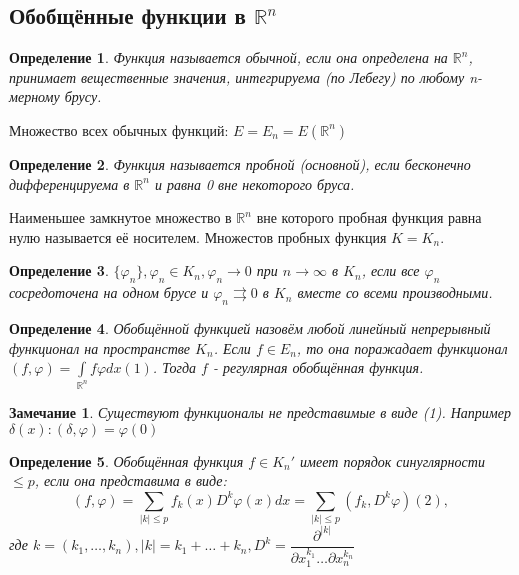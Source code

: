 \documentclass[9pt, a4paper]{article}
\newtheorem*{notabene}{Замечание}
\newtheorem*{definition}{Определение}
\begin{document}
	\subsection*{Обобщённые функции в $\mathbb{R}^n$}
		\begin{definition}
			Функция называется обычной, если она определена на $\mathbb{R}^n$, принимает вещественные значения, интегрируема (по Лебегу) по любому n-мерному брусу.
		\end{definition}
		Множество всех обычных функций: $E = E_n = E(\mathbb{R}^n)$
		\begin{definition}
			Функция называется пробной (основной), если бесконечно дифференцируема в $\mathbb{R}^n$ и равна 0 вне некоторого бруса.
		\end{definition}
		Наименьшее замкнутое множество в $\mathbb{R}^n$ вне которого пробная функция равна нулю называется её носителем.  Множестов пробных функция $K = K_n$. 
			\begin{definition}
				$\{\varphi_n\}, \varphi_n \in K_n, \varphi_n \to 0$ при $n\to\infty$ в $K_n$, если все $\varphi_n$ сосредоточена на одном брусе и $\varphi_n \rightrightarrows 0 $ в $K_n$ вместе со всеми производными.		
			\end{definition}
		\begin{definition}
			Обобщённой функцией назовём любой линейный непрерывный функционал на пространстве $K_n$. Если $f \in E_n$, то она поражадает функционал $(f, \varphi) = \int\limits_{\mathbb{R}^n} f\varphi dx (1)$. Тогда $f$ - регулярная обобщённая функция.
		\end{definition}
		\begin{notabene}
			Существуют функционалы не представимые в виде (1). Например $\delta(x): (\delta, \varphi) = \varphi(0)$
		\end{notabene}
		\begin{definition}
			Обобщённая функция $f \in K_n'$ имеет порядок синуглярности $\leq p$, если она представима в виде: 
			\begin{equation*}
				(f,\varphi) = \sum\limits_{|k| \leq p} f_k(x) D^k \varphi(x) dx  = \sum\limits_{|k| \leq p} (f_k, D^k \varphi) (2), 
			\end{equation*}
			где $k = (k_1, \dots, k_n), |k| = k_1 + \dots + k_n, D^k = \dfrac{\partial^{|k|}}{\partial x_1^{k_1} \dots \partial x_n^{k_n}}$
		\end{definition}
\end{document}
